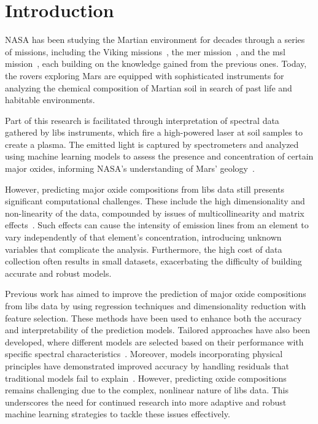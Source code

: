 \section{Introduction}\label{sec:introduction}
NASA has been studying the Martian environment for decades through a series of missions, including the Viking missions~\cite{marsnasagov_vikings}, the \gls{mer} mission~\cite{marsnasagov_observer, marsnasagov_spirit_opportunity}, and the \gls{msl} mission~\cite{marsnasagov_msl}, each building on the knowledge gained from the previous ones.
Today, the rovers exploring Mars are equipped with sophisticated instruments for analyzing the chemical composition of Martian soil in search of past life and habitable environments.

Part of this research is facilitated through interpretation of spectral data gathered by \gls{libs} instruments, which fire a high-powered laser at soil samples to create a plasma.
The emitted light is captured by spectrometers and analyzed using machine learning models to assess the presence and concentration of certain major oxides, informing NASA's understanding of Mars' geology~\cite{cleggRecalibrationMarsScience2017}.

However, predicting major oxide compositions from \gls{libs} data still presents significant computational challenges.
These include the high dimensionality and non-linearity of the data, compounded by issues of multicollinearity and matrix effects~\cite{andersonImprovedAccuracyQuantitative2017}.
Such effects can cause the intensity of emission lines from an element to vary independently of that element's concentration, introducing unknown variables that complicate the analysis.
Furthermore, the high cost of data collection often results in small datasets, exacerbating the difficulty of building accurate and robust models.

Previous work has aimed to improve the prediction of major oxide compositions from \gls{libs} data by using regression techniques and dimensionality reduction with feature selection.
These methods have been used to enhance both the accuracy and interpretability of the prediction models.
Tailored approaches have also been developed, where different models are selected based on their performance with specific spectral characteristics~\cite{rezaei_dimensionality_reduction, andersonPostlandingMajorElement2022}.
Moreover, models incorporating physical principles have demonstrated improved accuracy by handling residuals that traditional models fail to explain~\cite{song_DF-K-ELM}.
However, predicting oxide compositions remains challenging due to the complex, nonlinear nature of \gls{libs} data.
This underscores the need for continued research into more adaptive and robust machine learning strategies to tackle these issues effectively.

